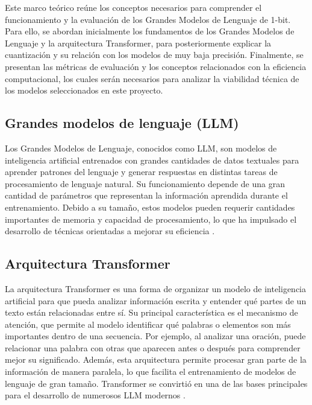 
Este marco teórico reúne los conceptos necesarios para comprender el funcionamiento y la evaluación de los Grandes Modelos de Lenguaje de 1-bit. Para ello, se abordan inicialmente los fundamentos de los Grandes Modelos de Lenguaje y la arquitectura Transformer, para posteriormente explicar la cuantización y su relación con los modelos de muy baja precisión. Finalmente, se presentan las métricas de evaluación y los conceptos relacionados con la eficiencia computacional, los cuales serán necesarios para analizar la viabilidad técnica de los modelos seleccionados en este proyecto.

\subsection{Grandes modelos de lenguaje (LLM)}

Los Grandes Modelos de Lenguaje, conocidos como LLM, son modelos de inteligencia artificial entrenados con grandes cantidades de datos textuales para aprender patrones del lenguaje y generar respuestas en distintas tareas de procesamiento de lenguaje natural. Su funcionamiento depende de una gran cantidad de parámetros que representan la información aprendida durante el entrenamiento. Debido a su tamaño, estos modelos pueden requerir cantidades importantes de memoria y capacidad de procesamiento, lo que ha impulsado el desarrollo de técnicas orientadas a mejorar su eficiencia \cite{llmSurvey2024}.

\subsection{Arquitectura Transformer}

La arquitectura Transformer es una forma de organizar un modelo de inteligencia artificial para que pueda analizar información escrita y entender qué partes de un texto están relacionadas entre sí. Su principal característica es el mecanismo de atención, que permite al modelo identificar qué palabras o elementos son más importantes dentro de una secuencia. Por ejemplo, al analizar una oración, puede relacionar una palabra con otras que aparecen antes o después para comprender mejor su significado. Además, esta arquitectura permite procesar gran parte de la información de manera paralela, lo que facilita el entrenamiento de modelos de lenguaje de gran tamaño. Transformer se convirtió en una de las bases principales para el desarrollo de numerosos LLM modernos \cite{transformerSurvey}.


